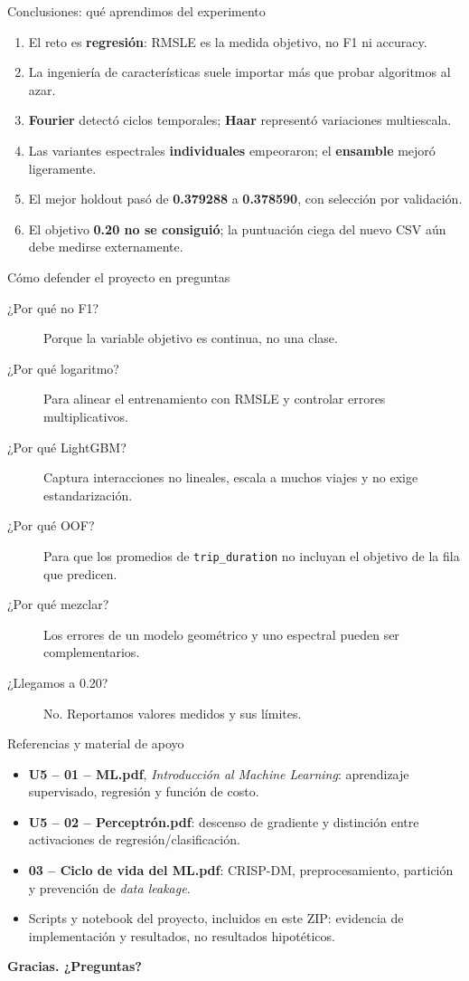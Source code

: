 \documentclass[aspectratio=169,11pt]{beamer}
\begin{document}
\begin{frame}{Conclusiones: qué aprendimos del experimento}
\small
\begin{enumerate}
\item El reto es \textbf{regresión}: RMSLE es la medida objetivo, no F1 ni accuracy.
\item La ingeniería de características suele importar más que probar algoritmos al azar.
\item \textbf{Fourier} detectó ciclos temporales; \textbf{Haar} representó variaciones multiescala.
\item Las variantes espectrales \textbf{individuales} empeoraron; el \textbf{ensamble} mejoró ligeramente.
\item El mejor holdout pasó de \textbf{0.379288} a \textbf{0.378590}, con selección por validación.
\item El objetivo \textbf{0.20 no se consiguió}; la puntuación ciega del nuevo CSV aún debe medirse externamente.
\end{enumerate}
\end{frame}

\begin{frame}{Cómo defender el proyecto en preguntas}
\small
\begin{description}
\item[¿Por qué no F1?] Porque la variable objetivo es continua, no una clase.
\item[¿Por qué logaritmo?] Para alinear el entrenamiento con RMSLE y controlar errores multiplicativos.
\item[¿Por qué LightGBM?] Captura interacciones no lineales, escala a muchos viajes y no exige estandarización.
\item[¿Por qué OOF?] Para que los promedios de \texttt{trip\_duration} no incluyan el objetivo de la fila que predicen.
\item[¿Por qué mezclar?] Los errores de un modelo geométrico y uno espectral pueden ser complementarios.
\item[¿Llegamos a 0.20?] No. Reportamos valores medidos y sus límites.
\end{description}
\end{frame}

\begin{frame}{Referencias y material de apoyo}
\footnotesize
\begin{itemize}
\item \textbf{U5 -- 01 -- ML.pdf}, \emph{Introducción al Machine Learning}: aprendizaje supervisado, regresión y función de costo.
\item \textbf{U5 -- 02 -- Perceptrón.pdf}: descenso de gradiente y distinción entre activaciones de regresión/clasificación.
\item \textbf{03 -- Ciclo de vida del ML.pdf}: CRISP-DM, preprocesamiento, partición y prevención de \emph{data leakage}.
\item Scripts y notebook del proyecto, incluidos en este ZIP: evidencia de implementación y resultados, no resultados hipotéticos.
\end{itemize}
\vspace{2mm}
\centering\textcolor{UNAMteal}{\Large \textbf{Gracias. ¿Preguntas?}}
\end{frame}
\end{document}
